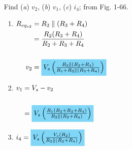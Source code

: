 Find (\textit{a}) $v_2$, (\textit{b}) $v_1$, (\textit{c}) $i_4$; from Fig. 1-66.
\begin{enumerate}[leftmargin=2cm,labelsep=.5cm,label=\bfseries\alph*)]
\item $
\begin{aligned}[t]
R_{eq_{v2}} &= R_2\parallel (R_3+R_4) \\
&= \frac{R_2(R_3+R_4)}{R_2+R_3+R_4} \\[5mm]
v_2 &= \hlbox{$V_s\left(\frac{R_2\parallel (R_3+R_4)}{R_1 + R_2\parallel (R_3+R_4)}\right)$} 
\end{aligned} $ 
\\[1cm]

\item $
\begin{aligned}[t]
v_1 &= V_s-v_2 \\[5mm]
&= \hlbox{$V_s\left(\frac{R_1(R_2+R_3+R_4)}{R_2\parallel (R_3+R_4)}\right)$} 
\end{aligned} $
\\[1cm]

\item $
\begin{aligned}[t]
i_4&= \hlbox{$V_s\left(\frac{V_s(R_2)}{R_2\parallel (R_3+R_4)}\right)$} 
\end{aligned} $
\\[1cm]

\end{enumerate}